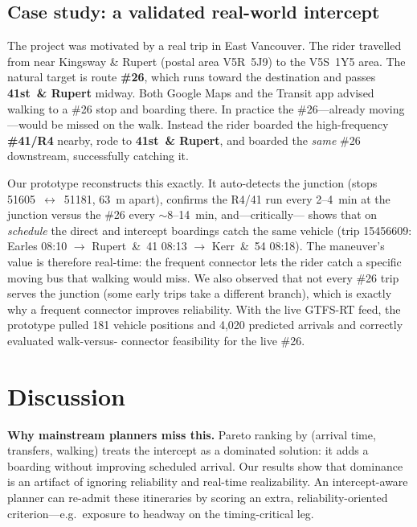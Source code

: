 \documentclass[conference]{IEEEtran}
\begin{document}
\subsection{Case study: a validated real-world intercept}
The project was motivated by a real trip in East Vancouver. The rider travelled
from near Kingsway \& Rupert (postal area V5R~5J9) to the V5S~1Y5 area. The
natural target is route \textbf{\#26}, which runs toward the destination and
passes \textbf{41st~\& Rupert} midway. Both Google Maps and the Transit app
advised walking to a \#26 stop and boarding there. In practice the \#26---already
moving---would be missed on the walk. Instead the rider boarded the
high-frequency \textbf{\#41/R4} nearby, rode to \textbf{41st~\& Rupert}, and
boarded the \emph{same} \#26 downstream, successfully catching it.

Our prototype reconstructs this exactly. It auto-detects the junction (stops
51605~$\leftrightarrow$~51181, 63~m apart), confirms the R4/41 run every
2--4~min at the junction versus the \#26 every $\sim$8--14~min, and---critically---
shows that on \emph{schedule} the direct and intercept boardings catch the same
vehicle (trip 15456609: Earles 08:10 $\rightarrow$ Rupert~\&~41 08:13
$\rightarrow$ Kerr~\&~54 08:18). The maneuver's value is therefore real-time: the
frequent connector lets the rider catch a specific moving bus that walking would
miss. We also observed that not every \#26 trip serves the junction (some early
trips take a different branch), which is exactly why a frequent connector improves
reliability. With the live GTFS-RT feed, the prototype pulled 181 vehicle
positions and 4{,}020 predicted arrivals and correctly evaluated walk-versus-
connector feasibility for the live \#26.

\section{Discussion}
\label{sec:discussion}
\textbf{Why mainstream planners miss this.} Pareto ranking by (arrival time,
transfers, walking) treats the intercept as a dominated solution: it adds a
boarding without improving scheduled arrival. Our results show that dominance is
an artifact of ignoring reliability and real-time realizability. An
intercept-aware planner can re-admit these itineraries by scoring an extra,
reliability-oriented criterion---e.g.\ exposure to headway on the
timing-critical leg.
\end{document}

